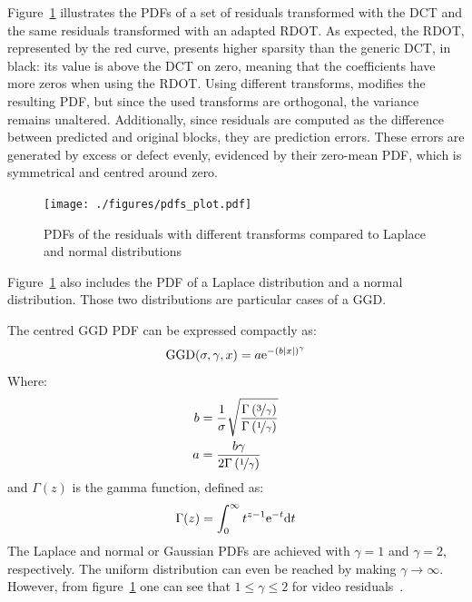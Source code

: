 \documentclass[11pt,a4paper,openright,twoside]{book}
\numberwithin{equation}{section} %
\numberwithin{figure}{section} %
\numberwithin{table}{section} %
\begin{document}
Figure~\ref{fig:probability_density_functions} illustrates the \acp{PDF}
of a set of residuals transformed with the \ac{DCT} and the same residuals
transformed with an adapted \ac{RDOT}.  As expected, the \ac{RDOT},
represented by the red curve, presents higher sparsity than the generic
\ac{DCT}, in black:
its value is above the \ac{DCT} on zero, meaning that the coefficients have
more zeros when using the \ac{RDOT}.
Using different transforms, modifies the resulting \ac{PDF}, but since the
used transforms are orthogonal, the variance remains unaltered.
Additionally, since residuals are computed as the difference between predicted
and original blocks, they are prediction errors.
These errors are generated by excess or defect evenly, evidenced by their
zero-mean \ac{PDF}, which is symmetrical and centred around zero.
\begin{figure}[tb]
	\centering
	\texttt{[image: ./figures/pdfs\_plot.pdf]}
	\caption[Different residuals \acsp{PDF} compared to Laplace and Normal
	distributions]
	{\acsp{PDF} of the residuals with different transforms
	compared to Laplace and normal distributions}
	\label{fig:probability_density_functions}
\end{figure}
Figure~\ref{fig:probability_density_functions} also includes the
\ac{PDF} of a Laplace distribution and a normal distribution.
Those two distributions are particular cases of a \ac{GGD}.

The centred \ac{GGD} \ac{PDF} can be expressed compactly as:
\begin{equation}
	\text{GGD}(\sigma,\gamma,x)=
	a\text{e}^{-{\left(b\vert x \vert\right)}^\gamma}
	\label{eqn:ggd}
\end{equation}
Where:
\begin{align}
	b &= \frac{1}{\sigma}\sqrt{
	\frac{\Gamma\left(\nicefrac{3}{\gamma}\right)}
	{\Gamma \left(\nicefrac{1}{\gamma}\right)}} \\
	a &= \frac{b\gamma}{2\Gamma \left(\nicefrac{1}{\gamma}\right)}
\end{align}
and $\Gamma(z)$ is the gamma function, defined as:
\begin{equation}
	\Gamma(z) = \int_0^\infty t^{z-1}\text{e}^{-t}\text{d} t
\end{equation}
The Laplace and normal or Gaussian \acp{PDF} are achieved with
$\gamma=1$ and $\gamma=2$, respectively.
The uniform distribution can even be reached by making $\gamma\to\infty$.
However, from figure~\ref{fig:probability_density_functions} one can see that
$1\le\gamma\le2$ for video
residuals~\cite{li-08-laplacian-modeling-dct-coefficients}.
\end{document}
